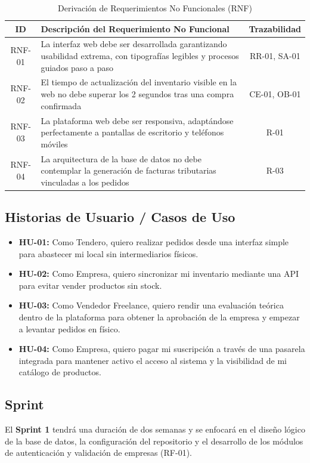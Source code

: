 \documentclass[12pt,a4paper]{article}
\begin{document}
\begin{table}[H]
    \centering
    \begin{tabularx}{\textwidth}{|c|X|c|}
        \hline
        \textbf{ID} & \textbf{Descripción del Requerimiento No Funcional} & \textbf{Trazabilidad} \\ \hline
        RNF-01 & La interfaz web debe ser desarrollada garantizando usabilidad extrema, con tipografías legibles y procesos guiados paso a paso & RR-01, SA-01 \\ \hline
        RNF-02 & El tiempo de actualización del inventario visible en la web no debe superar los 2 segundos tras una compra confirmada & CE-01, OB-01 \\ \hline
        RNF-03 & La plataforma web debe ser responsiva, adaptándose perfectamente a pantallas de escritorio y teléfonos móviles & R-01 \\ \hline
        RNF-04 & La arquitectura de la base de datos no debe contemplar la generación de facturas tributarias vinculadas a los pedidos & R-03 \\ \hline
    \end{tabularx}
    \caption{Derivación de Requerimientos No Funcionales (RNF)}
\end{table}

\subsection{Historias de Usuario / Casos de Uso}
\begin{itemize}
    \item \textbf{HU-01:} Como Tendero, quiero realizar pedidos desde una interfaz simple para abastecer mi local sin intermediarios físicos.
    \item \textbf{HU-02:} Como Empresa, quiero sincronizar mi inventario mediante una API para evitar vender productos sin stock.
    \item \textbf{HU-03:} Como Vendedor Freelance, quiero rendir una evaluación teórica dentro de la plataforma para obtener la aprobación de la empresa y empezar a levantar pedidos en físico.
    \item \textbf{HU-04:} Como Empresa, quiero pagar mi suscripción a través de una pasarela integrada para mantener activo el acceso al sistema y la visibilidad de mi catálogo de productos.
\end{itemize}

\subsection{Sprint}
El \textbf{Sprint 1} tendrá una duración de dos semanas y se enfocará en el diseño lógico de la base de datos, la configuración del repositorio y el desarrollo de los módulos de autenticación y validación de empresas (RF-01).
\end{document}
